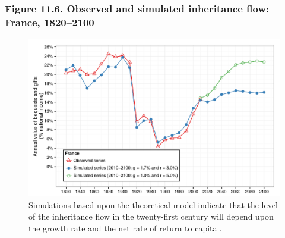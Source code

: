 \documentclass[t]{beamer}\usepackage[]{graphicx}\usepackage[]{color}
\newenvironment{knitrout}{}{} %
\begin{document}
\begin{frame}[label=Figure_11_6]
\frametitle{Figure 11.6. Observed and simulated inheritance flow: France, 1820--2100}
\begin{figure}[t]
\begin{minipage}[b]{\textwidth}
\centering
\begin{knitrout}\footnotesize
{}\color{fgcolor}

{\centering \includegraphics[width=1\linewidth]{figures/color/Figure_11_6} 

}



\end{knitrout}
\caption{Simulations based upon the theoretical model indicate that the level of the inheritance flow in the twenty-first century will depend upon the growth rate and the net rate of return to capital.}
\end{minipage}
\end{figure}
\end{frame}
\end{document}
